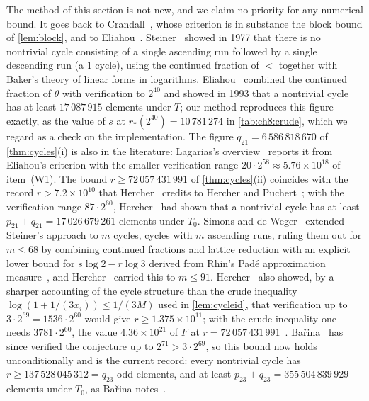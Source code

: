 \begin{remark}[Attribution]\label{rem:attribution}
The method of this section is not new, and we claim no priority for any
numerical bound. It goes back to Crandall~\cite{crandall1978}, whose criterion is in substance the block bound of \cref{lem:block}, and to Eliahou~\cite{eliahou1993}. Steiner~\cite{steiner1977} showed in 1977 that there is no
nontrivial cycle consisting of a single ascending run followed by a single
descending run (a $1$ cycle), using the continued fraction of $\lt$ together
with Baker's theory of linear forms in logarithms. Eliahou~\cite{eliahou1993}
combined the continued fraction of $\theta$ with verification to $2^{40}$ and
showed in 1993 that a nontrivial cycle has at least $17\,087\,915$ elements
under $T$; our method reproduces this figure exactly, as the value of $s$ at
$r_*(2^{40})=10\,781\,274$ in \cref{tab:ch8:crude}, which we regard as a
check on the implementation. The figure $q_{21}=6\,586\,818\,670$ of \cref{thm:cycles}(i) is also in the literature: Lagarias's overview~\cite[\S6.1, item~(W2)]{lagarias2010overview} reports it from Eliahou's criterion with the smaller verification range $20\cdot2^{58}\approx5.76\times10^{18}$ of item~(W1). The bound $r\geq72\,057\,431\,991$ of \cref{thm:cycles}(ii) coincides with the record $r>7.2\times10^{10}$ that Hercher~\cite{hercher2023} credits to Hercher and Puchert~\cite{hercher2018,puchert2018}; with the verification range $87\cdot2^{60}$, Hercher~\cite{hercher2018} had shown that a nontrivial cycle has at least $p_{21}+q_{21}=17\,026\,679\,261$ elements under $T_0$.
Simons and de Weger~\cite{simons2005} extended
Steiner's approach to $m$ cycles, cycles with $m$ ascending runs, ruling them
out for $m\leq68$ by combining continued fractions and lattice reduction with an explicit lower bound for $s\log2-r\log3$ derived from Rhin's Pad\'e approximation measure~\cite{rhin1987}, and
Hercher~\cite[Theorem~23]{hercher2023} carried this to $m\leq91$. Hercher~\cite[Corollary~29]{hercher2023} also showed, by a sharper accounting of the
cycle structure than the crude inequality $\log(1+1/(3x_i))\leq1/(3M)$ used
in \cref{lem:cycleid}, that verification up to $3\cdot2^{69}=1536\cdot2^{60}$ would give $r\geq1.375\times10^{11}$; with the crude inequality one needs $3781\cdot2^{60}$, the value $4.36\times10^{21}$ of $F$ at $r=72\,057\,431\,991$~\cite[Remark~28]{hercher2023}. Ba\v{r}ina~\cite{barina2025} has since verified the conjecture up to $2^{71}>3\cdot2^{69}$, so this bound now holds unconditionally and is the current record: every nontrivial cycle has $r\geq137\,528\,045\,312=q_{23}$ odd elements, and at least $p_{23}+q_{23}=355\,504\,839\,929$ elements under $T_0$, as Ba\v{r}ina notes~\cite[\S6]{barina2025}.

\end{remark}
